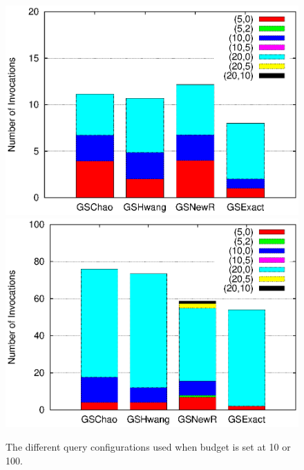 \begin{figure}[h]
	\vspace{-5pt}
    \includegraphics[clip,scale=0.32]{figs/queryConfBudget10.eps}
	\hspace{-10pt}
	\includegraphics[clip,scale=0.32]{figs/queryConfBudget100.eps}
	\vspace{-10pt}
	\caption{The different query configurations used when budget is set at 10 or 100.}\label{fig:queryconf}
	\vspace{-15pt}
\end{figure}



